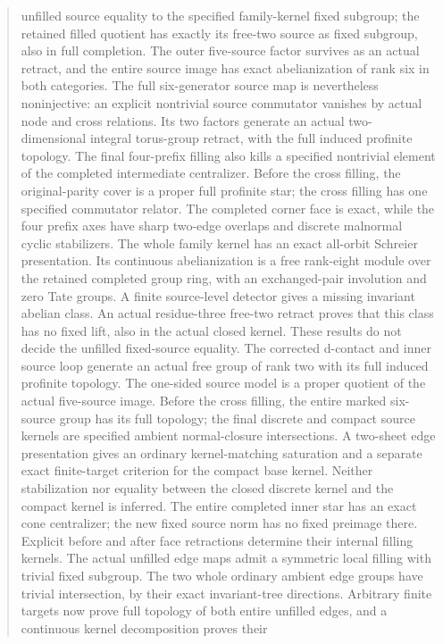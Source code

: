 \documentclass[11pt,a4paper]{article}
\begin{document}
\begin{abstract}
unfilled source equality to the specified family-kernel fixed subgroup;
the retained filled quotient has exactly its free-two source as fixed
subgroup, also in full completion. The outer five-source factor survives
as an actual retract, and the entire source image has exact abelianization
of rank six in both categories. The full six-generator source map is
nevertheless noninjective: an explicit nontrivial source commutator
vanishes by actual node and cross relations. Its two factors generate
an actual two-dimensional integral torus-group retract, with the full
induced profinite topology. The final four-prefix filling also kills a
specified nontrivial element of the completed intermediate centralizer.
Before the cross filling, the original-parity cover is a proper full
profinite star; the cross filling has one specified commutator relator.
The completed corner face is exact, while the four prefix axes have
sharp two-edge overlaps and discrete malnormal cyclic stabilizers.
The whole family kernel has an exact all-orbit Schreier presentation.
Its continuous abelianization is a free rank-eight module over the
retained completed group ring, with an exchanged-pair involution and
zero Tate groups. A finite source-level detector gives a missing
invariant abelian class. An actual residue-three free-two retract
proves that this class has no fixed lift, also in the actual closed
kernel. These results do not decide the unfilled fixed-source equality.
The corrected d-contact and inner source loop generate an actual free
group of rank two with its full induced profinite topology. The one-sided
source model is a proper quotient of the actual five-source image.
Before the cross filling, the entire marked six-source group has its
full topology; the final discrete and compact source kernels are specified
ambient normal-closure intersections. A two-sheet edge presentation gives
an ordinary kernel-matching saturation and a separate exact finite-target
criterion for the compact base kernel. Neither stabilization nor equality
between the closed discrete kernel and the compact kernel is inferred.
The entire completed inner star has an exact cone centralizer;
the new fixed source norm has no fixed preimage there. Explicit before
and after face retractions determine their internal filling kernels.
The actual unfilled edge maps admit a symmetric local filling with
trivial fixed subgroup. The two whole ordinary ambient edge groups have
trivial intersection, by their exact invariant-tree directions.
Arbitrary finite targets now prove full topology of both entire
unfilled edges, and a continuous kernel decomposition proves their

\end{abstract}
\end{document}
